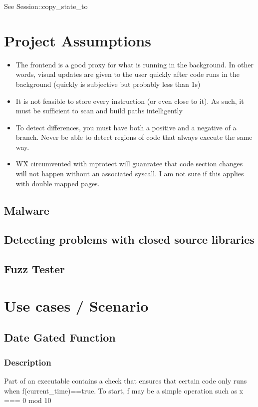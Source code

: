 See Session::copy\_state\_to

\section{Project Assumptions}
\begin{itemize}
    \item The frontend is a good proxy for what is running in the background. In other words, visual updates are given to the user quickly after code runs in the background (quickly is subjective but probably less than 1s) 
    \item It is not feasible to store every instruction (or even close to it). As such, it must be sufficient to scan and build paths intelligently
    \item To detect differences, you must have both a positive and a negative of a branch. Never be able to detect regions of code that always execute the same way.
    \item W\^X circumvented with mprotect will guanratee that code section changes will not happen without an associated syscall. 
        \subitem I am not sure if this applies with double mapped pages. 
\end{itemize}
\subsection{Malware}
\subsection{Detecting problems with closed source libraries}
\subsection{Fuzz Tester}
\section{Use cases / Scenario}
\subsection{Date Gated Function}
\subsubsection{Description}
Part of an executable contains a check that ensures that certain code only runs when f(current\_time)==true. To start, f may be a simple operation such as x === 0 mod 10

